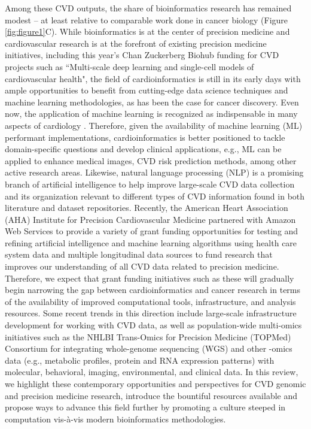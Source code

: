 \documentclass[letter]{bioinfo}
\begin{document}
Among these CVD outputs, the share of bioinformatics research has remained modest -- at least relative to comparable work done in cancer biology (Figure \ref{fig:figure1}C). While bioinformatics is at the center of precision medicine \citep{Gomez-Lopez:2017:Precision} and cardiovascular research is at the forefront of existing precision medicine initiatives, including this year's Chan Zuckerberg Biohub funding for CVD projects such as ``Multi-scale deep learning and single-cell models of cardiovascular health", the field of cardioinformatics is still in its early days with ample opportunities to benefit from cutting-edge data science techniques and machine learning methodologies, as has been the case for cancer discovery.  Even now, the application of machine learning is recognized as indispensable in many aspects of cardiology \citep{Shameer:2017:Translational,Shameer:2018:Machine}. Therefore, given the availability of machine learning (ML) performant implementations, cardioinformatics is better positioned to tackle domain-specific questions and develop clinical applications, e.g., ML can be applied to enhance medical images, CVD risk prediction methods, among other active research areas. Likewise, natural language processing (NLP) is a promising branch of artificial intelligence to help improve large-scale CVD data collection and its organization relevant to different types of CVD information found in both literature and dataset repositories.  Recently, the American Heart Association (AHA) Institute for Precision Cardiovascular Medicine partnered with Amazon Web Services to provide a variety of grant funding opportunities for testing and refining artificial intelligence and machine learning algorithms using health care system data and multiple longitudinal data sources to fund research that improves our understanding of all CVD data related to precision medicine.  Therefore, we expect that grant funding initiatives such as these will gradually begin narrowing the gap between cardioinformatics and cancer research in terms of the availability of improved computational tools, infrastructure, and analysis resources.  Some recent trends in this direction include large-scale infrastructure development \citep{Kass-Hout:2018:American} for working with CVD data, as well as population-wide multi-omics initiatives such as the NHLBI Trans-Omics for Precision Medicine (TOPMed) Consortium for integrating whole-genome sequencing (WGS) and other -omics data (e.g., metabolic profiles, protein and RNA expression patterns) with molecular, behavioral, imaging, environmental, and clinical data.  In this review, we highlight these contemporary opportunities and perspectives for CVD genomic and precision medicine research, introduce the bountiful resources available and propose ways to advance this field further by promoting a culture steeped in computation vis-\`{a}-vis modern bioinformatics methodologies.
\end{document}
